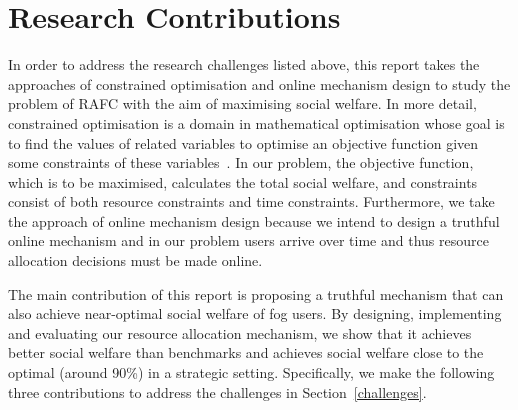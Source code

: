 \documentclass[11pt]{phdthesis}
\begin{document}



\section{Research Contributions} \label{contributions}

In order to address the research challenges listed above, this report takes the approaches of constrained optimisation and online mechanism design to study the problem of RAFC with the aim of maximising social welfare. In more detail, constrained optimisation is a domain in mathematical optimisation whose goal is to find the values of related variables to optimise an objective function given some constraints of these variables~\citep{bertsekas2014constrained}. In our problem, the objective function, which is to be maximised, calculates the total social welfare, and constraints consist of both resource constraints and time constraints. Furthermore, we take the approach of online mechanism design because we intend to design a truthful online mechanism and in our problem users arrive over time and thus resource allocation decisions must be made online.

The main contribution of this report is proposing a truthful mechanism that can also achieve near-optimal social welfare of fog users. By designing, implementing and evaluating our resource allocation mechanism, we show that it achieves better social welfare than benchmarks and achieves social welfare close to the optimal (around 90\%) in a strategic setting. Specifically, we make the following three contributions to address the challenges in Section~\ref{challenges}.
\end{document}
